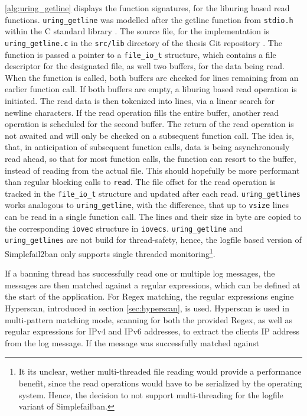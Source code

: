 \ref{alg:uring_getline} displays the function signatures, for the liburing based read functions. \texttt{uring\_getline} was modelled after the getline function
from \texttt{stdio.h} within the C standard library \cite{getline}.  The source file, 
for the implementation is \texttt{uring\_getline.c} in the \texttt{src/lib} directory of the thesis Git repository \cite{gitlab}. The function is passed a pointer to a \texttt{file\_io\_t} structure,   
which contains a file descriptor for the designated file, as well two buffers, for the data being read. When the function is called, both buffers are checked for lines remaining from an earlier function call.
If both buffers are empty, a liburing based read operation
is initiated. The read data is then tokenized into lines, via a linear search for newline characters. If the read operation fills the entire buffer, another read
operation is scheduled for the second buffer. The return of the read operation is not awaited and will only be checked on a subsequent function call. The idea is,
that, in anticipation of subsequent function calls, data is being asynchronously read ahead, so that for most function calls, the function can resort to the buffer, instead
of reading from the actual file. This should hopefully be more performant than regular blocking calls to \texttt{read}. The file offset for the read operation is tracked in
the \texttt{file\_io\_t} structure and updated after each read. \texttt{uring\_getlines} works analogous to \texttt{uring\_getline}, with the difference, that up to \texttt{vsize}
lines can be read in a single function call. The lines and their size in byte are copied to the corresponding \texttt{iovec} structure in \texttt{iovecs}.
\texttt{uring\_getline} and \texttt{uring\_getlines} are not build for thread-safety, hence, the logfile based version of Simplefail2ban only supports single threaded monitoring\footnote{It its unclear, wether multi-threaded file reading would provide a performance benefit, since the read operations would have to be serialized by the operating system. Hence, the decision to not support multi-threading for the logfile variant of Simplefailban.}.
\par
If a banning thread has successfully read one or multiple log messages, the messages are then matched against a regular expressions, which can be defined at the start of the application.
For \ac{Regex} matching, the regular expressions engine Hyperscan, introduced in section \ref{sec:hyperscan}, is used. Hyperscan is used in multi-pattern matching mode, scanning
for both the provided \ac{Regex}, as well as regular expressions for \ac{IPv4} and \ac{IPv6} addresses, to extract the clients \ac{IP} address from the log message. If the message was successfully matched against
